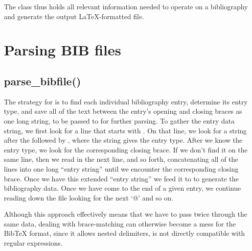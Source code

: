 \documentclass[letterpaper,10pt,english]{sphinxmanual}
\begin{document}
The  class thus holds all relevant information needed to operate on a bibliography and generate the output LaTeX-formatted  file.


\section{Parsing BIB files}
\label{developer_guide:parsing-bib-files}

\subsection{parse\_bibfile()}
\label{developer_guide:parse-bibfile}
The strategy for  is to find each individual bibliography entry, determine its entry type, and save all of the text between the entry's opening and closing braces as one long string, to be passed to  for further parsing. To gather the entry data string, we first look for a line that starts with . On that line, we look for a string after the  followed by \code{\{}, where the string gives the entry type. After we know the entry type, we look for the corresponding closing brace. If we don't find it on the same line, then we read in the next line, and so forth, concatenating all of the lines into one long ``entry string'' until we encounter the corresponding closing brace. Once we have this extended ``entry string'' we feed it to  to generate the bibliography data. Once we have come to the end of a given entry, we continue reading down the file looking for the next `@' and so on.

Although this approach effectively means that we have to pass twice through the same data, dealing with brace-matching can otherwise become a mess for the BibTeX format, since it allows nested delimiters, is not directly compatible with regular expressions.
\end{document}
